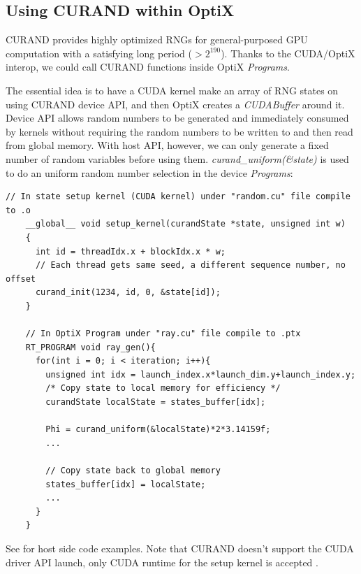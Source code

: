 
\subsection{Using CURAND within OptiX}
CURAND provides highly optimized RNGs for general-purposed GPU computation with a satisfying long period ($> 2^{190}$). Thanks to the CUDA/OptiX interop, we could call CURAND functions inside OptiX \textit{Programs}.

The essential idea is to have a CUDA kernel make an array of RNG states on using CURAND device API, and then OptiX creates a \textit{CUDABuffer} around it. Device API allows random numbers to be generated and immediately consumed by kernels without requiring the random numbers to be written to and then read from global memory. With host API, however, we can only generate a fixed number of random variables before using them. \textit{curand\_uniform(\&state)} is used to do an uniform random number selection in the device \textit{Programs}:
\begin{lstlisting}[mathescape]
    // In state setup kernel (CUDA kernel) under "random.cu" file compile to .o
    __global__ void setup_kernel(curandState *state, unsigned int w)
    {
      int id = threadIdx.x + blockIdx.x * w;
      // Each thread gets same seed, a different sequence number, no offset
      curand_init(1234, id, 0, &state[id]);
    }

    // In OptiX Program under "ray.cu" file compile to .ptx
    RT_PROGRAM void ray_gen(){
      for(int i = 0; i < iteration; i++){
        unsigned int idx = launch_index.x*launch_dim.y+launch_index.y;
        /* Copy state to local memory for efficiency */
        curandState localState = states_buffer[idx];

        Phi = curand_uniform(&localState)*2*3.14159f;
        ...

        // Copy state back to global memory
        states_buffer[idx] = localState;
        ...
      }
    }
\end{lstlisting}
See  for host side code examples. Note that CURAND doesn't support the CUDA driver API launch, only CUDA runtime for the setup kernel is accepted \citep{curand}.


